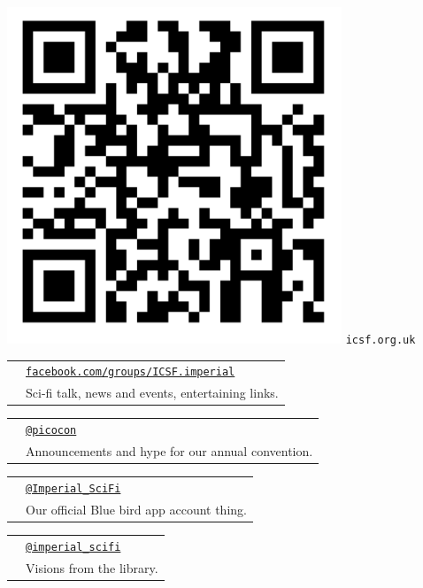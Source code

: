 \newcommand{\socialmedia}[3]{
  \begin{tabular}{r l}
    \multirow{2}{*}{\LARGE {#1}}
    & \texttt{#2} \\[-0.5em]
    & {\footnotesize #3}
  \end{tabular}
}
\begin{minipage}[t]{0.33\textwidth}
  \vspace{-1.3em}
  \begin{center}
  \includegraphics[width=0.75\textwidth]{img/qr-mailing-list.png}
  \texttt{icsf.org.uk}
  \end{center}
\end{minipage}
\begin{minipage}[t]{0.4\textwidth}
  \vspace{0em}
  \socialmedia{\faFacebookOfficial}{\href{https://www.facebook.com/groups/ICSF.imperial}{facebook.com/groups/ICSF.imperial}}{
    Sci-fi talk, news and events, entertaining links.}
  \socialmedia{\faTwitter}{\href{https://twitter.com/picocon}{@picocon}}{
    Announcements and hype for our annual convention.}
  \socialmedia{\faTwitter}{{\href{https://twitter.com/Imperial_SciFi}{@Imperial\_SciFi}}}{
    Our official Blue bird app account thing.}
  \socialmedia{\faInstagram}{\href{https://www.instagram.com/imperial_scifi/?hl=en}{@imperial\_scifi}}{
    Visions from the library.}
\end{minipage}
